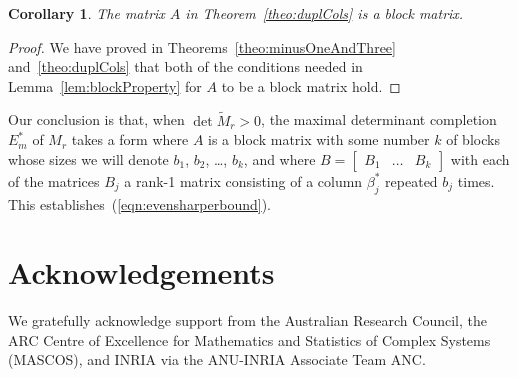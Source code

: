 \documentclass[11pt,a4paper]{article}
\newtheorem{corollary}[theorem]{Corollary}
\begin{document}
\begin{corollary}
The matrix $A$ in Theorem~\ref{theo:duplCols} is a block matrix.
\end{corollary}
\begin{proof}
We have proved in Theorems~\ref{theo:minusOneAndThree}
and~\ref{theo:duplCols} that both of the conditions needed in
Lemma~\ref{lem:blockProperty} for $A$ to be a block matrix hold.
\end{proof}

Our conclusion is that, when $\det\tilde M_r>0$, the maximal determinant
completion $E_m^*$ of $M_r$ takes a form where $A$ is a block matrix with
some number $k$ of blocks whose sizes we will denote $b_1$, $b_2$, \ldots,
$b_k$, and where $B=\begin{bmatrix}B_1 & \ldots & B_k\end{bmatrix}$ with
each of the matrices $B_j$ a rank-1 matrix consisting of a column
$\beta_j^*$ repeated $b_j$ times.  This
establishes~(\ref{eqn:evensharperbound}).


\section*{Acknowledgements}
We gratefully acknowledge support 
from the Australian Research Council, 
the ARC Centre of Excellence for Mathematics and Statistics of
Complex Systems (MASCOS), and 
INRIA via the ANU-INRIA Associate Team ANC.
\end{document}
